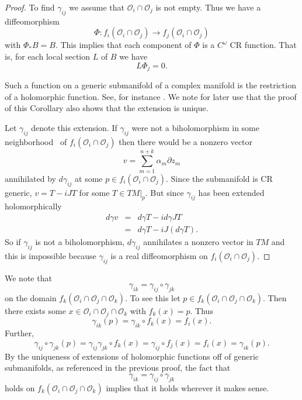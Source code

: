 \documentclass{amsart}
\begin{document}
\begin{proof}
To find $\gamma _{ij}$ we assume that ${\mathcal{O}} _i \cap {\mathcal{O}} _j$ is
not empty.  Thus we have a diffeomorphism
\[
\Phi : f_i({\mathcal{O}} _i \cap {\mathcal{O}} _j) \to f_j    ({\mathcal{O}} _i \cap
{\mathcal{O}} _j)
\]
with $\Phi _* B= B.$  This implies that each component of $\Phi$
is a $C^\omega$ CR function.  That is, for each local section $L$ of $B$
we have 
\[
L\Phi _j =0.
\]

Such a function on a generic submanifold of a complex manifold is the
restriction of a holomorphic function. See, for instance 
\cite[page 29, Corollary 1.7.13]{BER}.  We note for later use that the proof of this 
Corollary also shows that the extension is unique.

Let $\gamma _{ij}$ denote this extension.  If $\gamma _{ij}$ were
not a biholomorphism in some {neighborhood\ } of $f_i({\mathcal{O}} _i \cap {\mathcal{O}}
_j)$ then there would be a nonzero vector 
\[
v=\sum _
 {m=1}^{n+k} \alpha _{m }\partial z_{m}
\]
annihilated by $d\gamma _{ij}$ at some $p\in f_i({\mathcal{O}} _i \cap
{\mathcal{O}} _j)$.  Since the submanifold is CR generic, $v=T - iJT$ for
some $T\in TM|_p$.  But since $\gamma _{ij}$
 has been extended
holomorphically 
\begin{eqnarray*}
d\gamma v &=& d\gamma T-id\gamma JT\\
&=& d\gamma T- iJ(d\gamma T).
\end{eqnarray*}
So if $\gamma _{ij} $ is not a biholomorphism, $d\gamma _{ij}$
annihilates a nonzero vector in $TM$ and this is impossible because 
$\gamma_{ij}$ is a real diffeomorphism on $f_i({\mathcal{O}} _i\cap {\mathcal{O}} _j)$.
\end{proof}

We note that
\[
\gamma _{ik}=\gamma _{ij}\circ \gamma _{jk}
\]
on the domain $f_k({\mathcal{O}} _i\cap {\mathcal{O}} _j\cap{\mathcal{O}} _k)$.  To see this  let $p\in f_k({\mathcal{O}} _i\cap {\mathcal{O}} _j\cap{\mathcal{O}} _k)$.  Then there exists some $x\in {\mathcal{O}} _i\cap {\mathcal{O}} _j\cap{\mathcal{O}} _k$ with $f_k(x)=p$.  Thus
\[
\gamma _{ik}(p)=\gamma _{ik}\circ f _k(x)=f_i(x).
\]
Further, 
\[
\gamma _{ij}\circ\gamma _{jk}(p)=\gamma _{ij}\gamma_{jk}\circ f_k(x)=\gamma _{ij}\circ f_j(x)=f_i(x)=\gamma _{ik}(p).
\]
By the uniqueness of extensions of holomorphic functions
 off of
generic submanifolds,  as
referenced in the previous proof, the fact that 
\[
\gamma _{ik}=\gamma_{ij}\circ\gamma_{jk}
\]
holds on $f_k({\mathcal{O}} _i\cap {\mathcal{O}} _j\cap{\mathcal{O}} _k)$ implies that it holds wherever it makes sense.
\end{document}

